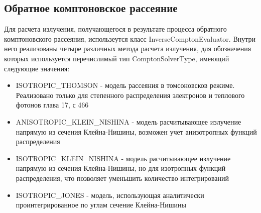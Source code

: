 \subsection{Обратное комптоновское рассеяние}
Для расчета излучения, получающегося в результате процесса обратного комптоновского рассеяния, использеутся класс InverseComptonEvaluator. Внутри него реализованы четыре различных метода расчета излучения, для обозначения которых используется перечислимый тип ComptonSolverType, имеющий следующие значения:

\begin{itemize}
	\item ISOTROPIC\_THOMSON - модель рассеяния в томсоновсков режиме. Реализовано только для степенного распределения электронов и теплового фотонов \cite{Ginzburg1975} глава 17, с 466
	\item ANISOTROPIC\_KLEIN\_NISHINA - модель расчитывающее излучение напрямую из сечения Клейна-Нишины, возможен учет анизотропных функций распределения \cite{KleinNishina, Dubus}
	\item ISOTROPIC\_KLEIN\_NISHINA - модель расчитывающее излучение напрямую из сечения Клейна-Нишины, но для изотропных функций распределения, что позволяет уменьшить количество интегрирований
	\item ISOTROPIC\_JONES - модель, использующая аналитически проинтегрированное по углам сечение Клейна-Нишины \cite{JonesCompton, BykovUvarov2000}
\end{itemize}

